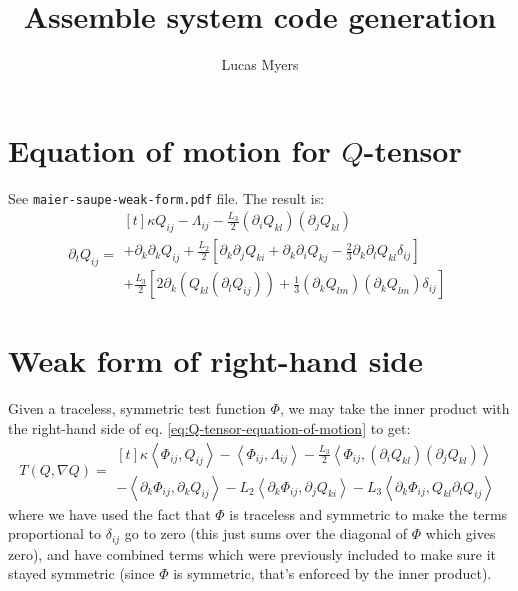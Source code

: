 \documentclass[reqno]{article}
\begin{document}
\title{Assemble system code generation}
\author{Lucas Myers}
\maketitle

\section{Equation of motion for $Q$-tensor}

See \verb|maier-saupe-weak-form.pdf| file.
The result is:
\begin{equation} \label{eq:Q-tensor-equation-of-motion}
    \partial_t Q_{ij}
    =
    \begin{multlined}[t]
    \kappa Q_{ij}
    - \Lambda_{ij}
    - \frac{L_3}{2} \left( \partial_i Q_{kl} \right) \left( \partial_j Q_{kl} \right) \\
    + \partial_k \partial_k Q_{ij}
    + \frac{L_2}{2} \left[ 
        \partial_k \partial_j Q_{ki} 
        + \partial_k \partial_i Q_{kj}
        - \tfrac23 \partial_k \partial_l Q_{kl} \delta_{ij}
    \right] \\
    + \frac{L_3}{2} \left[
        2 \partial_k \left( Q_{kl} \left( \partial_l Q_{ij} \right) \right)
        + \tfrac13 \left( \partial_k Q_{lm} \right) \left( \partial_k Q_{lm} \right) \delta_{ij}
    \right]
    \end{multlined}
\end{equation}

\section{Weak form of right-hand side}

Given a traceless, symmetric test function $\Phi$, we may take the inner product with the right-hand side of eq. \eqref{eq:Q-tensor-equation-of-motion} to get:
\begin{equation}
    T(Q, \nabla Q)
    =
    \begin{multlined}[t]
        \kappa \left< \Phi_{ij}, Q_{ij} \right>
        - \left< \Phi_{ij}, \Lambda_{ij} \right>
        - \frac{L_3}{2} \left< \Phi_{ij}, \left( \partial_i Q_{kl} \right) \left( \partial_j Q_{kl} \right) \right> \\
        - \left< \partial_k \Phi_{ij}, \partial_k Q_{ij} \right>
        - L_2 \left< \partial_k \Phi_{ij}, \partial_j Q_{ki} \right>
        - L_3 \left< \partial_k \Phi_{ij}, Q_{kl} \partial_l Q_{ij} \right>
    \end{multlined}
\end{equation}
where we have used the fact that $\Phi$ is traceless and symmetric to make the terms proportional to $\delta_{ij}$ go to zero (this just sums over the diagonal of $\Phi$ which gives zero), and have combined terms which were previously included to make sure it stayed symmetric (since $\Phi$ is symmetric, that's enforced by the inner product).
\end{document}
